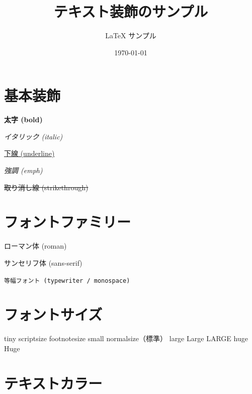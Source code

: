 \documentclass[lualatex,ja=standard]{bxjsarticle}
\title{テキスト装飾のサンプル}
\author{LaTeX サンプル}
\date{\today}
\begin{document}
\maketitle

\section{基本装飾}

\textbf{太字 (bold)}

\textit{イタリック (italic)}

\underline{下線 (underline)}

\emph{強調 (emph)} %

\sout{取り消し線 (strikethrough)} %


\section{フォントファミリー}

\textrm{ローマン体 (roman)} %

\textsf{サンセリフ体 (sans-serif)}

\texttt{等幅フォント (typewriter / monospace)}

\section{フォントサイズ}

{\tiny       tiny}
{\scriptsize scriptsize}
{\footnotesize footnotesize}
{\small      small}
{\normalsize normalsize（標準）}
{\large      large}
{\Large      Large}
{\LARGE      LARGE}
{\huge       huge}
{\Huge       Huge}

\section{テキストカラー}
\end{document}
